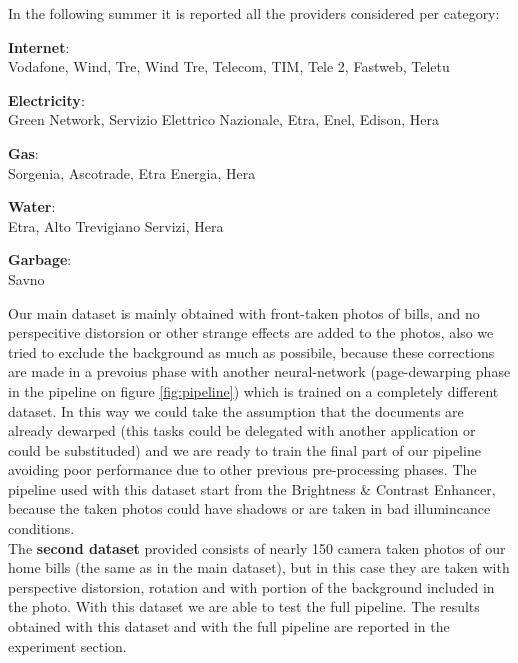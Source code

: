 \documentclass[10pt,twocolumn,letterpaper]{article}
\begin{document}
In the following summer it is reported all the providers considered per category:\\

\begin{itemize}
\end{itemize}

Our main dataset is mainly obtained with front-taken photos of bills, and no perspecitive distorsion or other strange effects are added to the photos, also we tried to exclude the background as much as possibile, because these corrections are made in a prevoius phase with another neural-network (page-dewarping phase in the pipeline on figure \ref{fig:pipeline}) which is trained on a completely different dataset. In this way we could take the assumption that the documents are already dewarped (this tasks could be delegated with another application or could be substituded) and we are ready to train the final part of our pipeline avoiding poor performance due to other previous pre-processing phases. The pipeline used with this dataset start from the Brightness \& Contrast Enhancer, because the taken photos could have shadows or are taken in bad illumincance conditions. \\

The \textbf{second dataset} provided consists of nearly 150 camera taken photos of our home bills (the same as in the main dataset), but in this case they are taken with perspective distorsion, rotation and with portion of the background included in the photo. With this dataset we are able to test the full pipeline. The results obtained with this dataset and with the full pipeline are reported in the experiment section. \\
\end{document}
